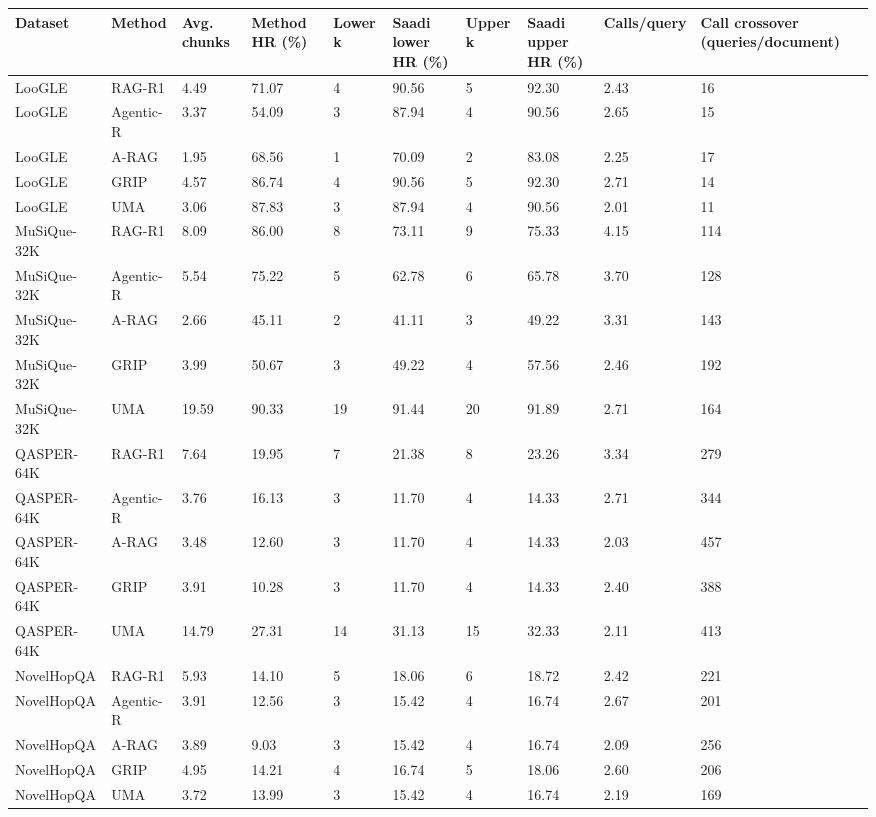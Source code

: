 \begin{tabular}{llllllllll}
\hline
Dataset & Method & Avg. chunks & Method HR (\%) & Lower k & Saadi lower HR (\%) & Upper k & Saadi upper HR (\%) & Calls/query & Call crossover (queries/document) \\
\hline
LooGLE & RAG-R1 & 4.49 & 71.07 & 4 & 90.56 & 5 & 92.30 & 2.43 & 16 \\
LooGLE & Agentic-R & 3.37 & 54.09 & 3 & 87.94 & 4 & 90.56 & 2.65 & 15 \\
LooGLE & A-RAG & 1.95 & 68.56 & 1 & 70.09 & 2 & 83.08 & 2.25 & 17 \\
LooGLE & GRIP & 4.57 & 86.74 & 4 & 90.56 & 5 & 92.30 & 2.71 & 14 \\
LooGLE & UMA & 3.06 & 87.83 & 3 & 87.94 & 4 & 90.56 & 2.01 & 11 \\
MuSiQue-32K & RAG-R1 & 8.09 & 86.00 & 8 & 73.11 & 9 & 75.33 & 4.15 & 114 \\
MuSiQue-32K & Agentic-R & 5.54 & 75.22 & 5 & 62.78 & 6 & 65.78 & 3.70 & 128 \\
MuSiQue-32K & A-RAG & 2.66 & 45.11 & 2 & 41.11 & 3 & 49.22 & 3.31 & 143 \\
MuSiQue-32K & GRIP & 3.99 & 50.67 & 3 & 49.22 & 4 & 57.56 & 2.46 & 192 \\
MuSiQue-32K & UMA & 19.59 & 90.33 & 19 & 91.44 & 20 & 91.89 & 2.71 & 164 \\
QASPER-64K & RAG-R1 & 7.64 & 19.95 & 7 & 21.38 & 8 & 23.26 & 3.34 & 279 \\
QASPER-64K & Agentic-R & 3.76 & 16.13 & 3 & 11.70 & 4 & 14.33 & 2.71 & 344 \\
QASPER-64K & A-RAG & 3.48 & 12.60 & 3 & 11.70 & 4 & 14.33 & 2.03 & 457 \\
QASPER-64K & GRIP & 3.91 & 10.28 & 3 & 11.70 & 4 & 14.33 & 2.40 & 388 \\
QASPER-64K & UMA & 14.79 & 27.31 & 14 & 31.13 & 15 & 32.33 & 2.11 & 413 \\
NovelHopQA & RAG-R1 & 5.93 & 14.10 & 5 & 18.06 & 6 & 18.72 & 2.42 & 221 \\
NovelHopQA & Agentic-R & 3.91 & 12.56 & 3 & 15.42 & 4 & 16.74 & 2.67 & 201 \\
NovelHopQA & A-RAG & 3.89 & 9.03 & 3 & 15.42 & 4 & 16.74 & 2.09 & 256 \\
NovelHopQA & GRIP & 4.95 & 14.21 & 4 & 16.74 & 5 & 18.06 & 2.60 & 206 \\
NovelHopQA & UMA & 3.72 & 13.99 & 3 & 15.42 & 4 & 16.74 & 2.19 & 169 \\
\hline
\end{tabular}
